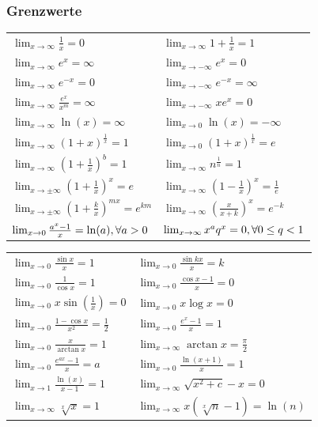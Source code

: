 \documentclass[a4paper,10pt]{article}
\def\limxo{\lim_{x\to 0}}
\def\limxi{\lim_{x\to\infty}}
\def\limxn{\lim_{x\to-\infty}}
\begin{document}
\subsubsection{Grenzwerte}
\begin{center}
  \begin{tabularx}{\linewidth}{XX}
    \toprule
    $\limxi \frac{1}{x} = 0$ & $\limxi 1 + \frac{1}{x} = 1$ \\
    $\limxi e^x = \infty$ & $\limxn e^x = 0$ \\
    $\limxi e^{-x} = 0$ & $\limxn e^{-x} = \infty$ \\
    $\limxi \frac{e^x}{x^m} = \infty$ & $\limxn xe^x = 0$ \\
    $\limxi \ln(x) = \infty$ & $\limxo \ln(x) = -\infty$ \\
    $\limxi (1+x)^{\frac{1}{x}} = 1$ & $\limxo (1+x)^{\frac{1}{x}} = e$ \\
    $\limxi (1+\frac{1}{x})^b = 1$ & $\limxi n^{\frac{1}{n}} = 1$ \\
    $\lim_{x\to\pm\infty} (1 + \frac{1}{x})^x = e$ & $\limxi (1-\frac{1}{x})^x = \frac{1}{e}$ \\
    $\lim_{x\to\pm\infty} (1 + \frac{k}{x})^{mx} = e^{km}$ & $\limxi (\frac{x}{x+k})^x = e^{-k}$ \\
    $\limxo \frac{a^x -1}{x} = \ln(a), \newline \forall a > 0$ &
    $\limxi x^a q^x = 0, \newline \forall 0 \le q < 1$ \\
  \end{tabularx}
  \begin{tabularx}{\linewidth}{XX}
    $\limxo \frac{\sin x}{x} = 1$ & $\limxo \frac{\sin kx}{x} = k$\\
    $\limxo \frac{1}{\cos x} = 1$ & $\limxo \frac{\cos x -1}{x} = 0$ \\
    $\limxo x \sin(\frac{1}{x}) = 0$ & $\limxo x \log x = 0$\\
    $\limxo \frac{1 - \cos x}{x^2} = \frac{1}{2}$ & $\limxo \frac{e^x-1}{x} = 1$ \\
    $\limxo \frac{x}{\arctan x} = 1$ & $\limxi \arctan x = \frac{\pi}{2}$ \\
    $\limxo \frac{e^{ax}-1}{x} = a$ & $\limxo \frac{\ln(x+1)}{x} = 1$ \\
    $\lim_{x\to 1} \frac{\ln(x)}{x-1} = 1$ & $\limxi \sqrt{x^2 + c} - x = 0$ \\
    $\limxi \sqrt[x]{x} = 1$ & $\limxi x(\sqrt[x]{n} - 1) = \ln(n)$ \\
    \bottomrule
  \end{tabularx}
\end{center}
\end{document}
